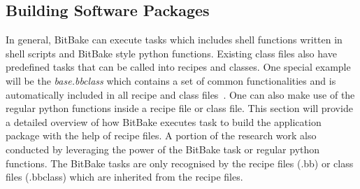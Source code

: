 \subsection{Building Software Packages} \label{section:softwarepackageinrecipes}

In general, BitBake can execute tasks which includes shell functions written in shell scripts and BitBake style python functions. Existing class files also have predefined tasks that can be called into recipes and classes. One special example will be the \emph{base.bbclass} which contains a set of common functionalities and is automatically included in all recipe and class files~\parencite{team2006openembedded}. One can also make use of the regular python functions inside a recipe file or class file. This section will provide a detailed overview of how BitBake executes task to build the application package with the help of recipe files. A portion of the research work also conducted by leveraging the power of the BitBake task or regular python functions. The BitBake tasks are only recognised by the recipe files (.bb) or class files (.bbclass) which are inherited from the recipe files. 

